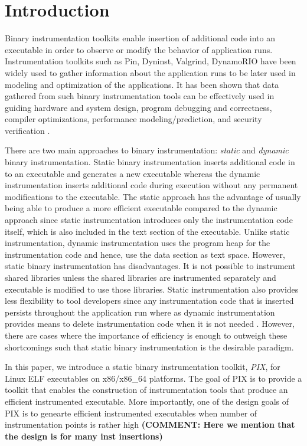 \section{Introduction}

Binary instrumentation toolkits enable insertion of additional code into an
executable in order to observe or modify the behavior of application runs. 
Instrumentation toolkits such as Pin\cite{luk2005pin}, Dyninst\cite{buck2000api}, 
Valgrind\cite{nethercote2007valgrind}, DynamoRIO\cite{bruening2004efficient} have been widely used to gather information about the
application runs to be later used in modeling and optimization
of the applications. It has been shown that data gathered 
from such binary instrumentation tools can be effectively used in guiding hardware and
system design, program debugging and correctness, compiler optimizations,
performance modeling/prediction, and security verification \cite{snavely2001modeling}.

There are two main approaches to binary instrumentation: \textit{static} 
and \textit{dynamic} binary instrumentation. Static binary
instrumentation inserts additional code in to an executable and generates a new
executable whereas the dynamic instrumentation inserts additional code 
during execution without any permanent modifications to the executable.
The static approach has the advantage of usually being able to produce
a more efficient executable compared to the dynamic approach
since static instrumentation introduces only the instrumentation code itself, 
which is also included in the text section of the executable. 
Unlike static instrumentation, dynamic
instrumentation uses the program heap for the instrumentation code and hence, use the data section as text space.
However, static binary instrumentation has disadvantages. It is not possible to instrument shared libraries 
unless the shared libraries are instrumented separately and executable is modified to use those libraries. 
Static instrumentation also provides less flexibility to tool developers since any instrumentation code that is
inserted persists throughout the application run where as dynamic instrumentation 
provides means to delete instrumentation code when it is not needed \cite{tikir2002efficient}.
However, there are cases where the importance of efficiency is enough to outweigh
these shortcomings \cite{carrington2006performance} such that static binary instrumentation is the
desirable paradigm.

In this paper, we introduce a static binary instrumentation toolkit, \textit{PIX}, for Linux ELF executables on
x86/x86\_64 platforms. The goal of PIX is to provide a toolkit that enables the construction of
instrumentation tools that produce an efficient instrumented
executable. More importantly, one of the design goals of PIX is to genearte efficient instrumented executables
when number of instrumentation points is rather high \textbf{(COMMENT: Here we mention that the design is for many inst insertions)} 

